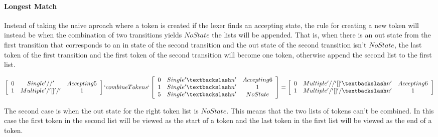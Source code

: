 \paragraph{Longest Match}\label{longmatch}
Instead of taking the naive aproach where a token is created if the lexer finds an
accepting state, the rule for creating a new token will instead be when the
combination of two transitions yields $NoState$ the lists will be appended. That
is, when there is an out state from the first transition that corresponds to an
in state of the second transition and the out state of the second transition
isn't $NoState$, the last token of the first transition and the first token of
the second transition will become one token, otherwise append the second list to
the first list.
\begin{center}
$\left[\begin{array}{ccc}
0&Single '//'& Accepting 5\\
1&Multiple '/' [] '/' &1\\
\end{array}\right] `combineTokens` 
\left[\begin{array}{ccc}
0&Single '\textbackslash n'&Accepting 6\\
1&Single '\textbackslash n'&1\\
5&Single '\textbackslash n'&NoState\\
\end{array}\right] =
\left[\begin{array}{ccc}
0&Multiple '//' [] '\textbackslash n'&Accepting 6\\
1&Multiple '/' [] '/\textbackslash n'&1\\
\end{array}\right]$
\end{center}
The second case is when the out state for the right token list is $NoState$.
This means that the two lists of tokens can't be combined. In this case the
first token in the second list will be viewed as the start of a token and the
last token in the first list will be viewed as the end of a token.

